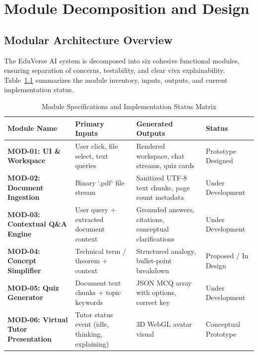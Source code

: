 \documentclass[11pt,a4paper]{report}
\begin{document}
\chapter{Module Decomposition and Design}
\label{ch:module_design}

\section{Modular Architecture Overview}
The EduVerse AI system is decomposed into six cohesive functional modules, ensuring separation of concerns, testability, and clear viva explainability. Table~\ref{tab:modules} summarizes the module inventory, inputs, outputs, and current implementation status.

\begin{table}[H]
\centering
\small
\renewcommand{\arraystretch}{1.2}
\begin{tabularx}{\textwidth}{p{3.2cm}p{4.2cm}p{4.2cm}p{3.0cm}}
\toprule
\textbf{Module Name} & \textbf{Primary Inputs} & \textbf{Generated Outputs} & \textbf{Status} \\
\midrule
\textbf{MOD-01: UI \& Workspace} & User click, file select, text queries & Rendered workspace, chat streams, quiz cards & Prototype Designed \\
\midrule
\textbf{MOD-02: Document Ingestion} & Binary `.pdf` file stream & Sanitized UTF-8 text chunks, page count metadata & Under Development \\
\midrule
\textbf{MOD-03: Contextual Q\&A Engine} & User query + extracted document context & Grounded answers, citations, conceptual clarifications & Under Development \\
\midrule
\textbf{MOD-04: Concept Simplifier} & Technical term / theorem + context & Structured analogy, bullet-point breakdown & Proposed / In Design \\
\midrule
\textbf{MOD-05: Quiz Generator} & Document text chunks + topic keywords & JSON MCQ array with options, correct key & Under Development \\
\midrule
\textbf{MOD-06: Virtual Tutor Presentation} & Tutor status event (idle, thinking, explaining) & 3D WebGL avatar visual & Conceptual Prototype \\
\bottomrule
\end{tabularx}
\caption{Module Specifications and Implementation Status Matrix}
\label{tab:modules}
\end{table}
\end{document}
